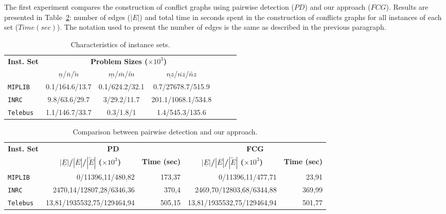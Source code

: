 \documentclass{endm}
\begin{document}
The first experiment compares the construction of conflict graphs using pairwise detection ($PD$) and our approach ($FCG$). Results are presented in Table~\ref{tab:graph}: number of edges ($|E|$) and total time in seconds spent in the construction of conflicts graphs for all instances of each set ($Time (sec)$). The notation used to present the number of edges is the same as described in the previous paragraph.

\begin{table}[htbp]
\scriptsize
\caption{Characteristics of instance sets.}
\begin{center}
\begin{tabular}{|l|c|c|c|c|r|r|}
\hline 
\multirow{2}{0.8cm}{\textbf{Inst. Set}} & \multicolumn{3}{c|}{{\textbf{Problem Sizes ($\times10^{3}$)}}} \tabularnewline
\cline{2-4} 
 & {$\underline{n}$/$\overline{n}$/$\tilde{n}$} & {$\underline{m}$/$\overline{m}$/$\tilde{m}$} & {$\underline{nz}$/$\overline{nz}$/$\tilde{nz}$} \tabularnewline
\hline 
\hline 
\texttt{MIPLIB} & {0.1/164.6/13.7} & {0.1/624.2/32.1} & {0.7/27678.7/515.9}\tabularnewline
\hline 
\texttt{INRC} & {9.8/63.6/29.7} & {3/29.2/11.7} & {201.1/1068.1/534.8}\tabularnewline
\hline 
\texttt{Telebus} & {1.1/146.7/33.7} & {0.3/1.8/1} & {1.4/545.3/135.6}\tabularnewline
\hline 
\end{tabular}
\end{center}
\label{tab:inst}
\end{table}

\begin{table}[htbp]
\scriptsize
\caption{Comparison between pairwise detection and our approach.}
\begin{center}
\begin{tabular}{|l|r|r|r|r|}
\hline
\multirow{2}{0.8cm}{\textbf{Inst. Set}} & \multicolumn{ 2}{c|}{\textbf{PD}} & \multicolumn{ 2}{c|}{\textbf{FCG}} \\ \cline{ 2- 5}
\multicolumn{ 1}{|c|}{} & \multicolumn{1}{c|}{\textbf{$|\underline{E}|$/$|\overline{E}|$/$|\tilde{E}|$ ($\times10^{3}$)}} & \multicolumn{1}{c|}{\textbf{Time (sec)}} & \multicolumn{1}{c|}{\textbf{$|\underline{E}|$/$|\overline{E}|$/$|\tilde{E}|$ ($\times10^{3}$)}} & \multicolumn{1}{c|}{\textbf{Time (sec)}} \\ \hline
\texttt{MIPLIB} & 0/11396,11/480,82 & 173,37 & 0/11396,11/477,71 & 23,91 \\ \hline
\texttt{INRC} & 2470,14/12807,28/6346,36 & 370,4 & 2469,70/12803,68/6344,88 & 369,99 \\ \hline
\texttt{Telebus} & 13,81/1935532,75/129464,94 & 505,15 & 13,81/1935532,75/129464,94 & 501,77 \\ \hline
\end{tabular}
\end{center}
\label{tab:graph}
\end{table}
\end{document}
